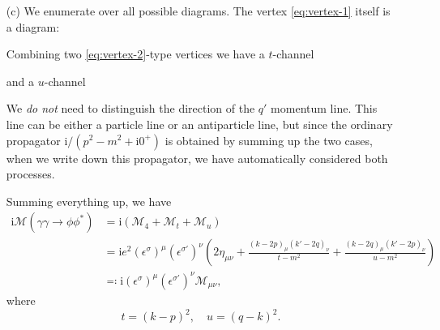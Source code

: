 \documentclass[hyperref, a4paper]{article}
\newcommand*{\ii}{\mathrm{i}}
\begin{document}
\begin{itemize}
\item[(c)] We enumerate over all possible diagrams. The vertex \eqref{eq:vertex-1} itself is a diagram:
 
Combining two \eqref{eq:vertex-2}-type vertices we have a $t$-channel

and a $u$-channel


\begin{note*}{}{}
    We \emph{do not} need to distinguish the direction of the $q'$ momentum line. This line can be either 
    a particle line or an antiparticle line, but since the ordinary propagator $\ii / (p^2 - m^2 + \ii 0^+)$ 
    is obtained by summing up the two cases, when we write down this propagator, we have automatically 
    considered both processes. 
\end{note*}

Summing everything up, we have 
\begin{equation}
    \begin{aligned}
        \ii \mathcal{M}(\gamma \gamma \to \phi \phi^*) &= \ii (\mathcal{M}_4 + \mathcal{M}_t + \mathcal{M}_u) \\
        &= \ii e^2 (\epsilon^\sigma)^\mu (\epsilon^{\sigma'})^\nu \left( 2 \eta_{\mu \nu} + \frac{(k-2p)_\mu (k'-2q)_\nu}{t - m^2} + \frac{(k-2q)_\mu (k'-2p)_\nu}{u - m^2} \right) \\
        &\eqqcolon \ii (\epsilon^\sigma)^\mu (\epsilon^{\sigma'})^\nu \mathcal{M}_{\mu \nu} ,
    \end{aligned}
\end{equation}
where 
\begin{equation}
    t = (k-p)^2, \quad u = (q-k)^2.
\end{equation}


\end{itemize}
\end{document}
